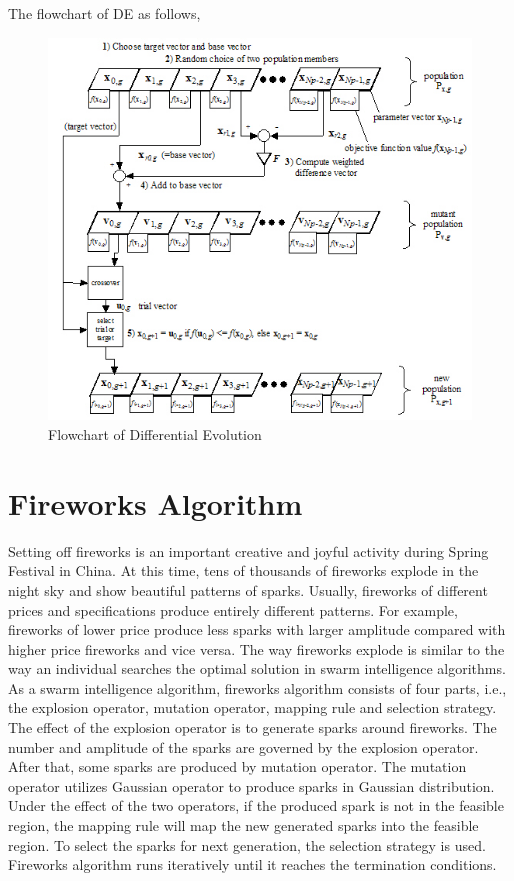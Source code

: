 \documentclass[11pt, a4paper]{report}
\begin{document}
\newpage 
The flowchart of DE as follows,
\vspace{30pt}
	\begin{figure}[!bth]
	\center
	\includegraphics[scale=1.2]{images/de2.jpg}
	\caption[Flowchart of Differential Evolution]{Flowchart of Differential Evolution \cite{diag:de}}
	\label{fig:deFlowchart}
	\end{figure}

\newpage

\section{Fireworks Algorithm}
Setting off fireworks is an important creative and joyful activity during Spring Festival in China. At this time, tens of thousands of fireworks explode in the night sky and show beautiful patterns of sparks. Usually, fireworks of different prices and specifications produce entirely different patterns. For example, fireworks of lower price produce less sparks with larger amplitude compared with higher price fireworks and vice versa. The way fireworks explode is similar to the way an individual searches the optimal solution in swarm intelligence algorithms. As a swarm intelligence algorithm, fireworks algorithm consists of four parts, i.e., the explosion operator, mutation operator, mapping rule and selection strategy. The effect of the explosion operator is to generate sparks around fireworks. The number and amplitude of the sparks are governed by the explosion operator. After that, some sparks are produced by mutation operator. The mutation operator utilizes Gaussian operator to produce sparks in Gaussian distribution. Under the effect of the two operators, if the produced spark is not in the feasible region, the mapping rule will map the new generated sparks into the feasible region. To select the sparks for next generation, the selection strategy is used. Fireworks algorithm runs iteratively until it reaches the termination conditions.
\end{document}
